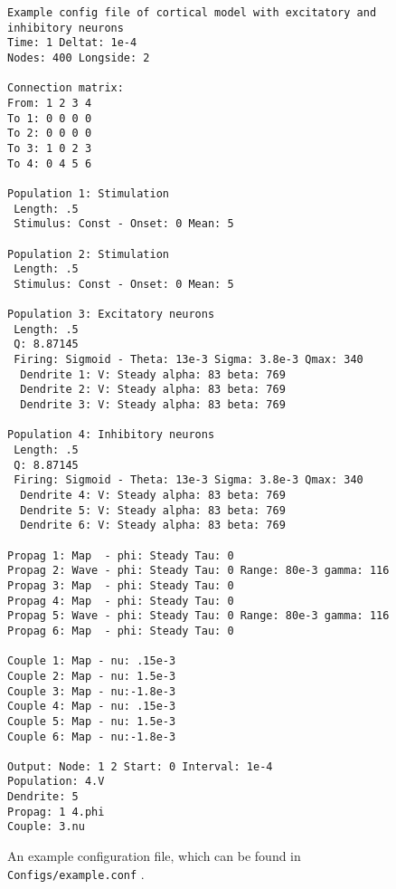 \documentclass[12pt,a4paper]{article}
\newcommand{\type}[1]{ {\small\small\tt #1} }
\begin{document}
\begin{figure}\begin{center}
	\begin{lstlisting}
Example config file of cortical model with excitatory and inhibitory neurons
Time: 1 Deltat: 1e-4
Nodes: 400 Longside: 2

Connection matrix:
From: 1 2 3 4
To 1: 0 0 0 0
To 2: 0 0 0 0
To 3: 1 0 2 3
To 4: 0 4 5 6

Population 1: Stimulation
 Length: .5
 Stimulus: Const - Onset: 0 Mean: 5

Population 2: Stimulation
 Length: .5
 Stimulus: Const - Onset: 0 Mean: 5

Population 3: Excitatory neurons
 Length: .5
 Q: 8.87145
 Firing: Sigmoid - Theta: 13e-3 Sigma: 3.8e-3 Qmax: 340
  Dendrite 1: V: Steady alpha: 83 beta: 769
  Dendrite 2: V: Steady alpha: 83 beta: 769
  Dendrite 3: V: Steady alpha: 83 beta: 769

Population 4: Inhibitory neurons
 Length: .5
 Q: 8.87145
 Firing: Sigmoid - Theta: 13e-3 Sigma: 3.8e-3 Qmax: 340
  Dendrite 4: V: Steady alpha: 83 beta: 769
  Dendrite 5: V: Steady alpha: 83 beta: 769
  Dendrite 6: V: Steady alpha: 83 beta: 769

Propag 1: Map  - phi: Steady Tau: 0
Propag 2: Wave - phi: Steady Tau: 0 Range: 80e-3 gamma: 116
Propag 3: Map  - phi: Steady Tau: 0
Propag 4: Map  - phi: Steady Tau: 0
Propag 5: Wave - phi: Steady Tau: 0 Range: 80e-3 gamma: 116
Propag 6: Map  - phi: Steady Tau: 0

Couple 1: Map - nu: .15e-3
Couple 2: Map - nu: 1.5e-3
Couple 3: Map - nu:-1.8e-3
Couple 4: Map - nu: .15e-3
Couple 5: Map - nu: 1.5e-3
Couple 6: Map - nu:-1.8e-3

Output: Node: 1 2 Start: 0 Interval: 1e-4
Population: 4.V
Dendrite: 5
Propag: 1 4.phi
Couple: 3.nu
	\end{lstlisting}
\end{center}
\caption{An example configuration file, which can be found in \type{Configs/example.conf}.}
\end{figure}

\FloatBarrier
\end{document}
